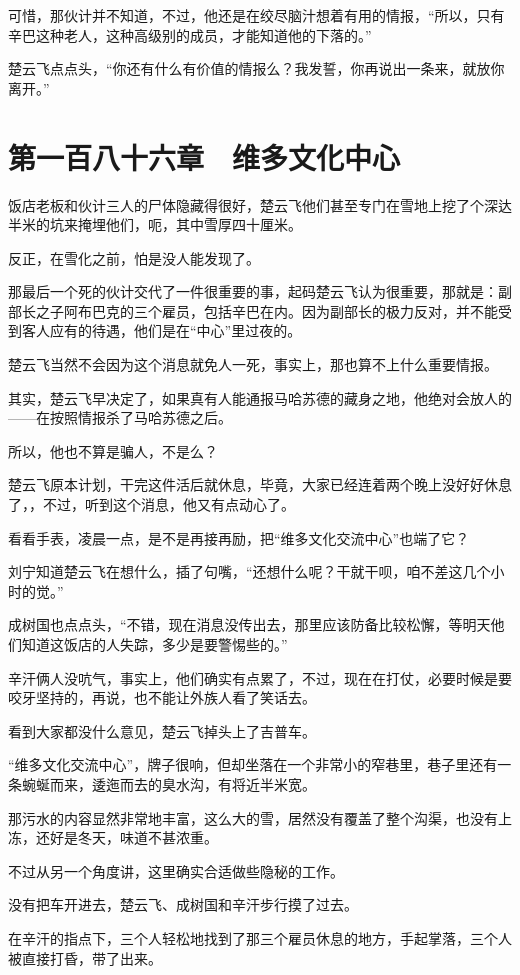 可惜，那伙计并不知道，不过，他还是在绞尽脑汁想着有用的情报，“所以，只有辛巴这种老人，这种高级别的成员，才能知道他的下落的。”

楚云飞点点头，“你还有什么有价值的情报么？我发誓，你再说出一条来，就放你离开。”

\section{第一百八十六章　维多文化中心}

饭店老板和伙计三人的尸体隐藏得很好，楚云飞他们甚至专门在雪地上挖了个深达半米的坑来掩埋他们，呃，其中雪厚四十厘米。

反正，在雪化之前，怕是没人能发现了。

那最后一个死的伙计交代了一件很重要的事，起码楚云飞认为很重要，那就是：副部长之子阿布巴克的三个雇员，包括辛巴在内。因为副部长的极力反对，并不能受到客人应有的待遇，他们是在“中心”里过夜的。

楚云飞当然不会因为这个消息就免人一死，事实上，那也算不上什么重要情报。

其实，楚云飞早决定了，如果真有人能通报马哈苏德的藏身之地，他绝对会放人的——在按照情报杀了马哈苏德之后。

所以，他也不算是骗人，不是么？

楚云飞原本计划，干完这件活后就休息，毕竟，大家已经连着两个晚上没好好休息了，，不过，听到这个消息，他又有点动心了。

看看手表，凌晨一点，是不是再接再励，把“维多文化交流中心”也端了它？

刘宁知道楚云飞在想什么，插了句嘴，“还想什么呢？干就干呗，咱不差这几个小时的觉。”

成树国也点点头，“不错，现在消息没传出去，那里应该防备比较松懈，等明天他们知道这饭店的人失踪，多少是要警惕些的。”

辛汗俩人没吭气，事实上，他们确实有点累了，不过，现在在打仗，必要时候是要咬牙坚持的，再说，也不能让外族人看了笑话去。

看到大家都没什么意见，楚云飞掉头上了吉普车。

“维多文化交流中心”，牌子很响，但却坐落在一个非常小的窄巷里，巷子里还有一条蜿蜒而来，逶迤而去的臭水沟，有将近半米宽。

那污水的内容显然非常地丰富，这么大的雪，居然没有覆盖了整个沟渠，也没有上冻，还好是冬天，味道不甚浓重。

不过从另一个角度讲，这里确实合适做些隐秘的工作。

没有把车开进去，楚云飞、成树国和辛汗步行摸了过去。

在辛汗的指点下，三个人轻松地找到了那三个雇员休息的地方，手起掌落，三个人被直接打昏，带了出来。

